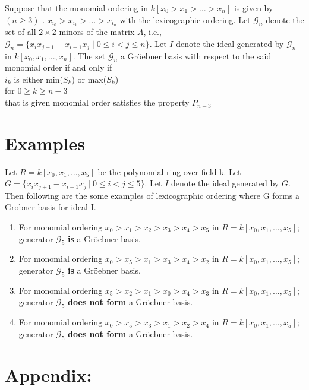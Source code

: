 \documentclass[12pt,a4paper]{article}
\theoremstyle{definition}
\begin{document}
\noindent Suppose that the monomial ordering in $k[x_{0} > x_{1} > \ldots > x_{n}]$ is given by $( n \geq 3)$ .
$x_{i_{0}} > x_{i_{1}} > \ldots > x_{i_{n}} $ with the lexicographic ordering. Let $\mathcal{G}_n$ denote the set of all $2\times 2$ minors of the matrix $A$, i.e., $\mathcal{G}_n = \{x_{i}x_{j+1}-x_{i+1}x_{j} \mid 0 \leq i < j \leq n\}$. Let $I$ denote the  ideal  generated by $\mathcal{G}_n$ in $k[x_{0}, x_{1},...,x_{n}]$. The set $\mathcal{G}_n$ a Gr\"{o}ebner  basis with respect to the said monomial order if and only if \\
$i_{k}$ is either min($S_{k}$) or max($S_{k}$) \\
for $0 \geq k \geq n-3$\\
that is given monomial order satisfies the property $P_{n-3}$

\section*{Examples}

Let $R=k[x_0, x_1, \ldots, x_5]$ be the polynomial ring over field k. Let $G = \{x_ix_{j+1}-x_{i+1}x_j\ |\ 0\leq i<j \leq 5\}$. Let $I$ denote the ideal generated by $G$. Then following are the some examples of lexicographic ordering where G forms a Grobner basis for ideal I.

\begin{enumerate}
\item For monomial ordering $x_0>x_1>x_2>x_3>x_4>x_5$ in $R=k[x_0, x_1, \ldots , x_5]$; generator $\mathcal{G}_5$ {\bf is} a Gr\"{o}ebner basis.
\item For monomial ordering $x_0>x_5>x_1>x_3>x_4>x_2$ in $R=k[x_0, x_1, \ldots , x_5]$; generator $\mathcal{G}_5$ {\bf is} a Gr\"{o}ebner basis.
\item For monomial ordering $x_5>x_2>x_1>x_0>x_4>x_3$ in $R=k[x_0, x_1, \ldots , x_5]$; generator $\mathcal{G}_5$ {\bf does not form} a Gr\"{o}ebner basis.
\item For monomial ordering $x_0 > x_5 > x_3 > x_1 > x_2 > x_4$ in $R=k[x_0, x_1, \ldots , x_5]$; generator $\mathcal{G}_5$ {\bf does not form} a Gr\"{o}ebner basis.

\end{enumerate}


\section*{Appendix:}
\end{document}

